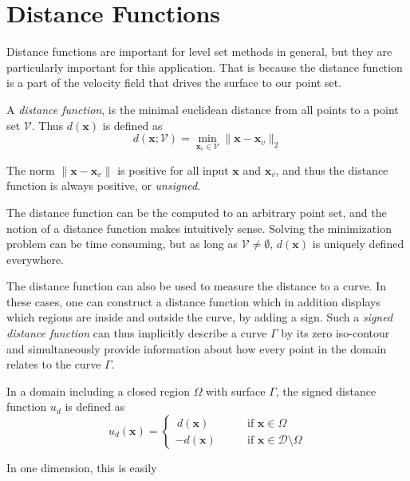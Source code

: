 \section{Distance Functions}\label{sec:distance-function}

Distance functions are important for level set methods in general, but they are particularly important for this application. That is because the distance function is a part of the velocity field that drives the surface to our point set.

\begin{definition}
A \textit{distance function}, is the minimal euclidean distance from all points to a point set $\mathcal{V}$. Thus $d(\mathbf{x})$ is defined as 
\begin{equation}
    d(\mathbf{x};\mathcal{V}) = \min_{\mathbf{x}_{v} \in \mathcal{V}} \|\mathbf{x}-\mathbf{x}_{v} \|_2
    \label{eq:unsigned-distance-function}
\end{equation}
\end{definition}

The norm $\|\mathbf{x}-\mathbf{x}_{v} \|$ is positive for all input $\mathbf{x}$ and $\mathbf{x}_{v}$, and thus the distance function is always positive, or \textit{unsigned}.


The distance function can be the computed to an arbitrary point set, and the notion of a distance function makes intuitively sense. Solving the minimization problem can be time consuming, but as long as $\mathcal{V}\neq \emptyset$, $d(\mathbf{x})$ is uniquely defined everywhere.

The distance function can also be used to measure the distance to a curve. In these cases, one can construct a distance function which in addition displays which regions are inside and outside the curve, by adding a sign. Such a \textit{signed distance function} can thus implicitly describe a curve $\Gamma$ by its zero iso-contour and simultaneously provide information about how every point in the domain relates to the curve $\Gamma$.

\begin{definition}
In a domain \domain including a closed region $\Omega$ with surface $\Gamma$, the signed distance function $u_d$ is defined as
\begin{equation}u_d(\mathbf{x}) = \begin{cases} \, d(\mathbf{x}) \qquad & \text{if } \mathbf{x}\in \Omega\\ -d(\mathbf{x}) \qquad & \text{if } \mathbf{x}\in \mathcal{D} \setminus \Omega\end{cases}
\end{equation}
\end{definition}

In one dimension, this is easily 
